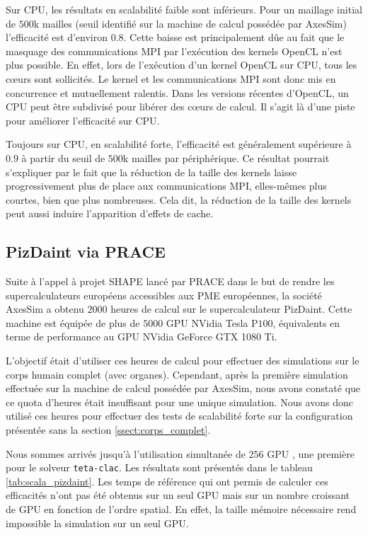Sur CPU, les résultats en scalabilité faible sont inférieurs.
Pour un maillage initial
de $500$k mailles (seuil identifié sur la machine de calcul possédée par AxesSim)
l'efficacité est d'environ $0.8$.
Cette baisse est principalement dûe au fait que le masquage des communications
MPI par l'exécution des kernels OpenCL n'est plus possible. En effet,
lors de l'exécution d'un kernel OpenCL sur CPU, tous les cœurs sont sollicités.
Le kernel et les communications MPI sont donc mis en concurrence et mutuellement ralentis.
Dans les versions récentes d'OpenCL, un CPU peut être subdivisé pour libérer des
cœurs de calcul. Il s'agit là d'une piste pour améliorer l'efficacité sur CPU.

Toujours sur CPU, en scalabilité forte, l'efficacité est généralement supérieure à $0.9$
à partir du seuil de $500$k mailles par périphérique.
Ce résultat pourrait s'expliquer par le fait que la réduction de la taille des kernels
laisse progressivement plus de place aux communications MPI, elles-mêmes
plus courtes, bien que plus nombreuses.
Cela dit, la réduction de la taille des kernels peut aussi induire
l'apparition d'effets de cache.
\\


\subsection{PizDaint via PRACE}
\label{ssect:pizdaint}

Suite à l'appel à projet SHAPE lancé par PRACE dans le but
de rendre les supercalculateurs européens accessibles aux PME
européennes, la société AxesSim a obtenu $2000$ heures
de calcul sur le supercalculateur PizDaint.
Cette machine est équipée de plus de $5000$ GPU NVidia Tesla P$100$,
équivalents en terme de performance au GPU NVidia GeForce GTX 1080 Ti.

L'objectif était d'utiliser ces heures de calcul pour effectuer des simulations
sur le corps humain complet (avec organes). Cependant, après la première
simulation effectuée sur la machine de calcul possédée par AxesSim, nous
avons constaté que ce quota d'heures était insuffisant pour une unique simulation.
Nous avons donc utilisé ces heures pour effectuer des tests de scalabilité forte
sur la configuration présentée sans la section \ref{ssect:corps_complet}.

Nous sommes arrivés jusqu'à l'utilisation simultanée de $256$ GPU
\cite{prace_whitepaper}, une première pour le solveur \texttt{teta-clac}.
Les résultats sont présentés dans le tableau \ref{tab:scala_pizdaint}.
Les temps de référence qui ont permis de calculer
ces efficacités n'ont pas été obtenus sur un seul GPU mais sur un nombre
croissant de GPU en fonction de l'ordre spatial. En effet,
la taille mémoire nécessaire rend impossible la simulation sur un seul GPU.


